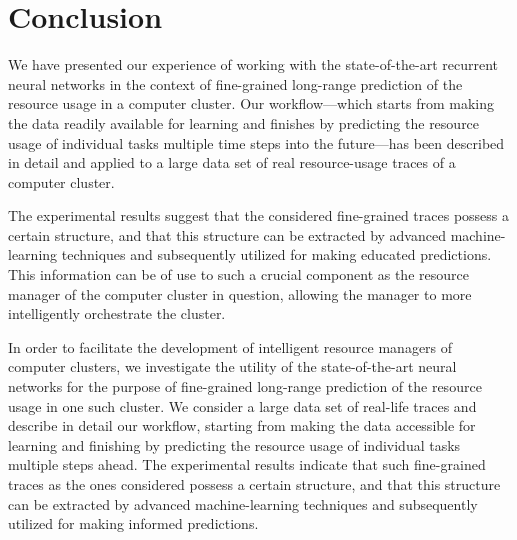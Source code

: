 \section{Conclusion}

We have presented our experience of working with the state-of-the-art recurrent
neural networks in the context of fine-grained long-range prediction of the
resource usage in a computer cluster. Our workflow---which starts from making
the data readily available for learning and finishes by predicting the resource
usage of individual tasks multiple time steps into the future---has been
described in detail and applied to a large data set of real resource-usage
traces of a computer cluster.

The experimental results suggest that the considered fine-grained traces possess
a certain structure, and that this structure can be extracted by advanced
machine-learning techniques and subsequently utilized for making educated
predictions. This information can be of use to such a crucial component as the
resource manager of the computer cluster in question, allowing the manager to
more intelligently orchestrate the cluster.

In order to facilitate the development of intelligent resource managers of
computer clusters, we investigate the utility of the state-of-the-art neural
networks for the purpose of fine-grained long-range prediction of the resource
usage in one such cluster. We consider a large data set of real-life traces and
describe in detail our workflow, starting from making the data accessible for
learning and finishing by predicting the resource usage of individual tasks
multiple steps ahead. The experimental results indicate that such fine-grained
traces as the ones considered possess a certain structure, and that this
structure can be extracted by advanced machine-learning techniques and
subsequently utilized for making informed predictions.
